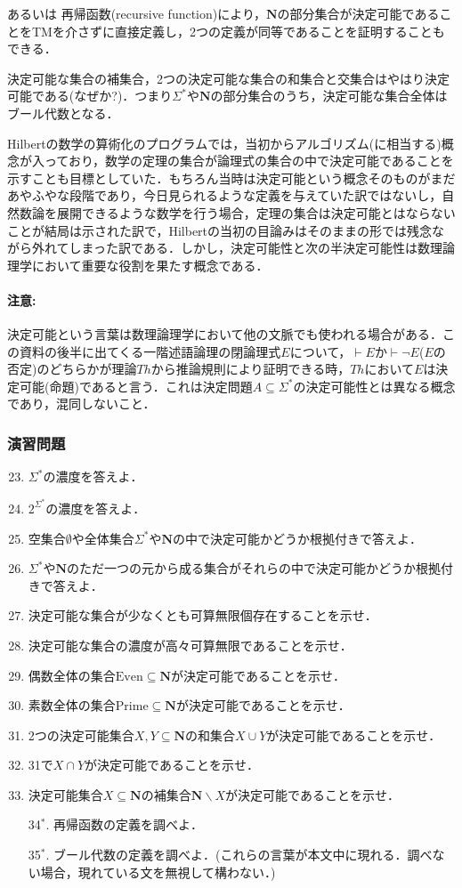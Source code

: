 \documentclass{ltjsarticle}
\theoremstyle{mystyle1}
\theoremstyle{mystyle3}
\theoremstyle{mystyle2}
\newcommand{\bN}{\ensuremath{\mathbf{N}}}
\newcommand{\red}[1]{{\color{red} #1}}
\begin{document}
あるいは\red{再帰函数}(recursive function)により，$\bN$の部分集合が決定可能であることをTMを介さずに直接定義し，2つの定義が同等であることを証明することもできる．

決定可能な集合の補集合，2つの決定可能な集合の和集合と交集合はやはり決定可能である(なぜか?)．つまり$\Sigma^\ast$や$\bN$の部分集合のうち，決定可能な集合全体は\red{ブール代数}となる．

Hilbertの数学の算術化のプログラムでは，当初からアルゴリズム(に相当する)概念が入っており，数学の定理の集合が論理式の集合の中で決定可能であることを示すことも目標としていた．もちろん当時は決定可能という概念そのものがまだあやふやな段階であり，今日見られるような定義を与えていた訳ではないし，自然数論を展開できるような数学を行う場合，定理の集合は決定可能とはならないことが結局は示された訳で，Hilbertの当初の目論みはそのままの形では残念ながら外れてしまった訳である．しかし，決定可能性と次の半決定可能性は数理論理学において重要な役割を果たす概念である．
\paragraph{注意:}
決定可能という言葉は数理論理学において他の文脈でも使われる場合がある．この資料の後半に出てくる一階述語論理の閉論理式$E$について，$\vdash E$か$\vdash\neg E$($E$の否定)のどちらかが理論$Th$から推論規則により証明できる時，$Th$において$E$は決定可能(命題)であると言う．これは決定問題$A\subseteq\Sigma^\ast$の決定可能性とは異なる概念であり，混同しないこと．
\subsubsection*{演習問題}
\begin{enumerate}
  \setcounter{enumi}{22}
  \item $\Sigma^\ast$の濃度を答えよ．
  \item $2^{\Sigma^\ast}$の濃度を答えよ．
  \item 空集合$\emptyset$や全体集合$\Sigma^\ast$や$\bN$の中で決定可能かどうか根拠付きで答えよ．
  \item $\Sigma^\ast$や$\bN$のただ一つの元から成る集合がそれらの中で決定可能かどうか根拠付きで答えよ．
  \item 決定可能な集合が少なくとも可算無限個存在することを示せ．
  \item 決定可能な集合の濃度が高々可算無限であることを示せ．
  \item 偶数全体の集合$\mathrm{Even}\subseteq\bN$が決定可能であることを示せ．
  \item 素数全体の集合$\mathrm{Prime}\subseteq\bN$が決定可能であることを示せ．
  \item 2つの決定可能集合$X,Y\subseteq\bN$の和集合$X\cup Y$が決定可能であることを示せ．
  \item 31で$X\cap Y$が決定可能であることを示せ．
  \item 決定可能集合$X\subseteq\bN$の補集合$\bN\backslash X$が決定可能であることを示せ．
  \item[34$^\ast$.] 再帰函数の定義を調べよ．
  \item[35$^\ast$.] ブール代数の定義を調べよ．(これらの言葉が本文中に現れる．調べない場合，現れている文を無視して構わない．)
\end{enumerate}
\end{document}
